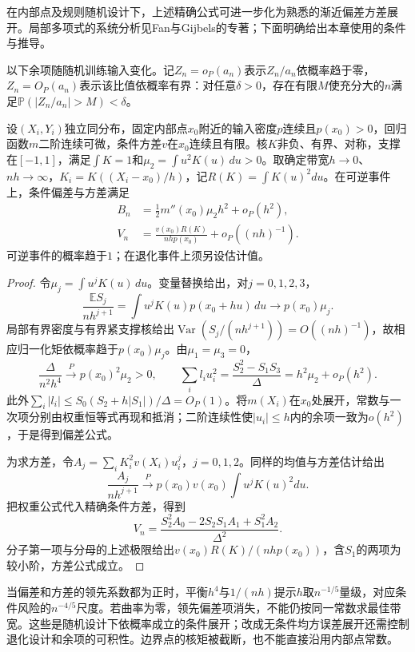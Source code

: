 在内部点及规则随机设计下，上述精确公式可进一步化为熟悉的渐近偏差方差展开。局部多项式的系统分析见Fan与Gijbels的专著；下面明确给出本章使用的条件与推导。

以下余项随随机训练输入变化。记$Z_n=o_P(a_n)$表示$Z_n/a_n$依概率趋于零，$Z_n=O_P(a_n)$表示该比值依概率有界：对任意$\delta>0$，存在有限$M$使充分大的$n$满足$\mathbb{P}(|Z_n/a_n|>M)<\delta$。

\begin{theorem}[一维内部点的局部线性展开]
  \label{thm:regression-local-asymptotic}
  设$(X_i,Y_i)$独立同分布，固定内部点$x_0$附近的输入密度$p$连续且$p(x_0)>0$，回归函数$m$二阶连续可微，条件方差$v$在$x_0$连续且有限。核$K$非负、有界、对称，支撑在$[-1,1]$，满足$\int K=1$和$\mu_2=\int u^2K(u)\,du>0$。取确定带宽$h\to0$、$nh\to\infty$，$K_i=K((X_i-x_0)/h)$，记$R(K)=\int K(u)^2du$。在可逆事件上，条件偏差与方差满足
  \begin{align*}
    B_n&=\tfrac12 m''(x_0)\mu_2h^2+o_P(h^2),\\
    V_n&=\frac{v(x_0)R(K)}{nhp(x_0)}+o_P((nh)^{-1}).
  \end{align*}
  可逆事件的概率趋于$1$；在退化事件上须另设估计值。
\end{theorem}

\begin{proof}
令$\mu_j=\int u^jK(u)\,du$。变量替换给出，对$j=0,1,2,3$，
\[
  \frac{\mathbb{E}S_j}{nh^{j+1}}
  =\int u^jK(u)p(x_0+hu)\,du\longrightarrow p(x_0)\mu_j.
\]
局部有界密度与有界紧支撑核给出$\operatorname{Var}(S_j/(nh^{j+1}))=O((nh)^{-1})$，故相应归一化矩依概率趋于$p(x_0)\mu_j$。由$\mu_1=\mu_3=0$，
\[
  \frac{\Delta}{n^2h^4}\xrightarrow{P}p(x_0)^2\mu_2>0,\qquad
  \sum_i l_i u_i^2
    =\frac{S_2^2-S_1S_3}{\Delta}
    =h^2\mu_2+o_P(h^2).
\]
此外$\sum_i|l_i|\leq S_0(S_2+h|S_1|)/\Delta=O_P(1)$。将$m(X_i)$在$x_0$处展开，常数与一次项分别由权重恒等式再现和抵消；二阶连续性使$|u_i|\leq h$内的余项一致为$o(h^2)$，于是得到偏差公式。

为求方差，令$A_j=\sum_iK_i^2v(X_i)u_i^j$，$j=0,1,2$。同样的均值与方差估计给出
\[
  \frac{A_j}{nh^{j+1}}
    \xrightarrow{P}p(x_0)v(x_0)\int u^jK(u)^2du.
\]
把权重公式代入精确条件方差，得到
\[
  V_n=\frac{S_2^2A_0-2S_2S_1A_1+S_1^2A_2}{\Delta^2}.
\]
分子第一项与分母的上述极限给出$v(x_0)R(K)/(nhp(x_0))$，含$S_1$的两项为较小阶，方差公式成立。
\end{proof}

当偏差和方差的领先系数都为正时，平衡$h^4$与$1/(nh)$提示$h$取$n^{-1/5}$量级，对应条件风险的$n^{-4/5}$尺度。若曲率为零，领先偏差项消失，不能仍按同一常数求最佳带宽。这些是随机设计下依概率成立的条件展开；改成无条件均方误差展开还需控制退化设计和余项的可积性。边界点的核矩被截断，也不能直接沿用内部点常数。

